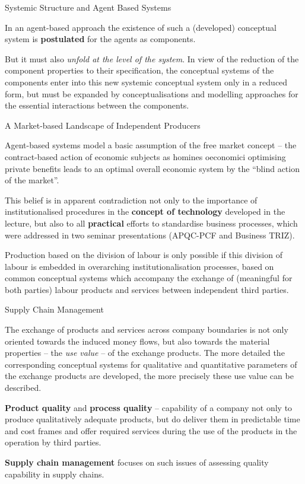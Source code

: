 \documentclass{beamer}
\begin{document}
\begin{frame}{Systemic Structure and Agent Based Systems}

In an agent-based approach the existence of such a (developed) conceptual
system is \textbf{postulated} for the agents as components.

But it must also \emph{unfold at the level of the system}. In view of the
reduction of the component properties to their specification, the conceptual
systems of the components enter into this new systemic conceptual system only
in a reduced form, but must be expanded by conceptualisations and modelling
approaches for the essential interactions between the components.
\end{frame}

\begin{frame}{A Market-based Landscape of Independent Producers}

Agent-based systems model a basic assumption of the free market concept -- the
contract-based action of economic subjects as homines oeconomici optimising
private benefits leads to an optimal overall economic system by the
\enquote{blind action of the market}.

This belief is in apparent contradiction not only to the importance of
institutionalised procedures in the \textbf{concept of technology} developed
in the lecture, but also to all \textbf{practical} efforts to standardise
business processes, which were addressed in two seminar presentations
(APQC-PCF and Business TRIZ).

Production based on the division of labour is only possible if this division
of labour is embedded in overarching institutionalisation processes, based on
common conceptual systems which accompany the exchange of (meaningful for both
parties) labour products and services between independent third parties.

\end{frame}

\begin{frame}{Supply Chain Management}

The exchange of products and services across company boundaries is not only
oriented towards the induced money flows, but also towards the material
properties -- the \emph{use value} -- of the exchange products. The more
detailed the corresponding conceptual systems for qualitative and quantitative
parameters of the exchange products are developed, the more precisely these
use value can be described.

\textbf{Product quality} and \textbf{process quality} -- capability of a
company not only to produce qualitatively adequate products, but do deliver
them in predictable time and cost frames and offer required services during
the use of the products in the operation by third parties.

\textbf{Supply chain management} focuses on such issues of assessing quality
capability in supply chains.
  
\end{frame}
\end{document}
